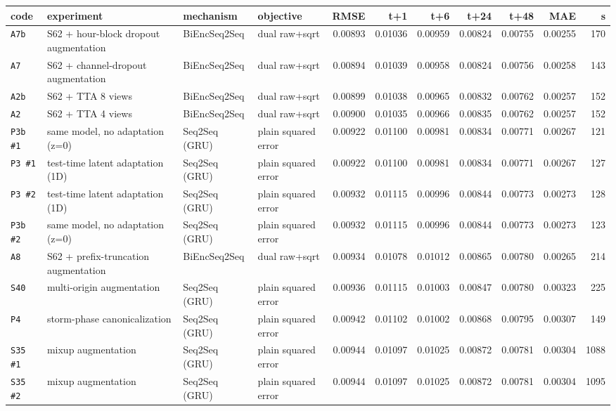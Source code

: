 \documentclass[9pt,landscape]{article}
\begin{document}
\begin{longtable}{@{}p{1.1cm}p{5.4cm}p{3.1cm}p{2.7cm}rrrrrrr@{}}
\toprule code & experiment & mechanism & objective & RMSE & t+1 & t+6 & t+24 & t+48 & MAE & s \\ \midrule \endhead
\texttt{A7b} & S62 + hour-block dropout augmentation & BiEncSeq2Seq & dual raw+sqrt & 0.00893 & 0.01036 & 0.00959 & 0.00824 & 0.00755 & 0.00255 & 170 \\
\texttt{A7} & S62 + channel-dropout augmentation & BiEncSeq2Seq & dual raw+sqrt & 0.00894 & 0.01039 & 0.00958 & 0.00824 & 0.00756 & 0.00258 & 143 \\
\texttt{A2b} & S62 + TTA 8 views & BiEncSeq2Seq & dual raw+sqrt & 0.00899 & 0.01038 & 0.00965 & 0.00832 & 0.00762 & 0.00257 & 152 \\
\texttt{A2} & S62 + TTA 4 views & BiEncSeq2Seq & dual raw+sqrt & 0.00900 & 0.01035 & 0.00966 & 0.00835 & 0.00762 & 0.00257 & 152 \\
\texttt{P3b \#1} & same model, no adaptation (z=0) & Seq2Seq (GRU) & plain squared error & 0.00922 & 0.01100 & 0.00981 & 0.00834 & 0.00771 & 0.00267 & 121 \\
\texttt{P3 \#1} & test-time latent adaptation (1D) & Seq2Seq (GRU) & plain squared error & 0.00922 & 0.01100 & 0.00981 & 0.00834 & 0.00771 & 0.00267 & 127 \\
\texttt{P3 \#2} & test-time latent adaptation (1D) & Seq2Seq (GRU) & plain squared error & 0.00932 & 0.01115 & 0.00996 & 0.00844 & 0.00773 & 0.00273 & 128 \\
\texttt{P3b \#2} & same model, no adaptation (z=0) & Seq2Seq (GRU) & plain squared error & 0.00932 & 0.01115 & 0.00996 & 0.00844 & 0.00773 & 0.00273 & 123 \\
\texttt{A8} & S62 + prefix-truncation augmentation & BiEncSeq2Seq & dual raw+sqrt & 0.00934 & 0.01078 & 0.01012 & 0.00865 & 0.00780 & 0.00265 & 214 \\
\texttt{S40} & multi-origin augmentation & Seq2Seq (GRU) & plain squared error & 0.00936 & 0.01115 & 0.01003 & 0.00847 & 0.00780 & 0.00323 & 225 \\
\texttt{P4} & storm-phase canonicalization & Seq2Seq (GRU) & plain squared error & 0.00942 & 0.01102 & 0.01002 & 0.00868 & 0.00795 & 0.00307 & 149 \\
\texttt{S35 \#1} & mixup augmentation & Seq2Seq (GRU) & plain squared error & 0.00944 & 0.01097 & 0.01025 & 0.00872 & 0.00781 & 0.00304 & 1088 \\
\texttt{S35 \#2} & mixup augmentation & Seq2Seq (GRU) & plain squared error & 0.00944 & 0.01097 & 0.01025 & 0.00872 & 0.00781 & 0.00304 & 1095 \\

\end{longtable}
\end{document}
